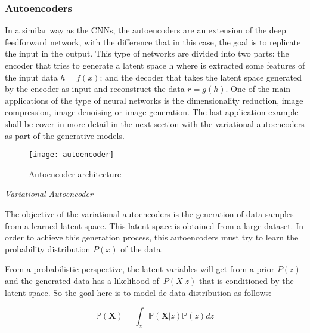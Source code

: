 \subsubsection{Autoencoders}

In a similar way as the CNNs, the autoencoders are an extension of the deep feedforward network, with the difference that in this case, the goal is to replicate the input in the output. This type of networks are divided into two parts: the encoder that tries to generate a latent space h where is extracted some features of the input data \begin{math} h = f(x) \end{math}; and the decoder that takes the latent space generated by the encoder as input and reconstruct the data \begin{math} r = g(h) \end{math}. One of the main applications of the type of neural networks is the dimensionality reduction, image compression, image denoising or image generation. The last application example shall be cover in more detail in the next section with the variational autoencoders as part of the generative models.

\begin{figure}[htb]
  \centering
  \texttt{[image: autoencoder]}
  \caption[Autoencoder architecture]{Autoencoder architecture}
  \label{fig:autoencoder}
\end{figure}

\textit{Variational Autoencoder}

The objective of the variational autoencoders \cite{Kingma2014} is the generation of data samples from a learned latent space. This latent space is obtained from a large dataset. In order to achieve this generation process, this autoencoders must try to learn the probability distribution \begin{math} P(x) \end{math} of the data.

From a probabilistic perspective, the latent variables will get from a prior \begin{math} P(z) \end{math} and the generated data has a likelihood of \begin{math} P(X|z) \end{math} that is conditioned by the latent space. So the goal here is to model de data distribution as follows:

\begin{equation}
 \mathbb{P}(\mathbf{X})=\int_{z} \mathbb{P}(\mathbf{X} | z) \mathbb{P}(z) d z
\end{equation}

